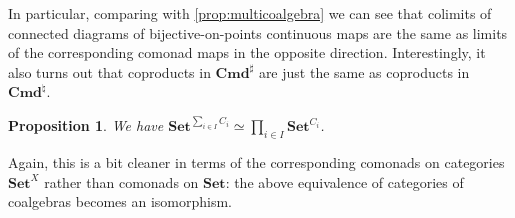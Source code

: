 \documentclass[11pt, oneside, article]{memoir}
\theoremstyle{plain}
\newtheorem{proposition}[theorem]{Proposition}
\theoremstyle{definition}
\theoremstyle{remark}
\DeclarePairedDelimiter{\abs}{\lvert}{\rvert}
\newcommand{\xto}[1]{\xrightarrow{#1}}
\newcommand{\namedcat}[1]{\mathbf{#1}}
\newcommand{\cat}[1]{\mathbf{#1}}
\newcommand{\Set}{\namedcat{Set}}
\newcommand{\Com}{\namedcat{Cmd}^\sharp}
\newcommand{\ComSet}{\Com}
\newcommand{\Con}{\namedcat{Cmd}^\natural}
\newcommand{\ConSet}{\Con}
\newcommand{\CoalgOn}[2]{{#2}^{#1}}
\newcommand{\CoalgSet}[1]{\CoalgOn{#1}{\Set}}
\newcommand{\pts}[1]{{\abs{#1}}}
\newcommand{\obs}[1]{\pts{#1}}
\newcommand{\carr}{\Sigma}
\newcommand{\reindex}[1]{\Delta_{#1}}
\newcommand{\car}[1]{\carr^{#1}}
\newcommand{\carC}{\car{\cC}}
\newcommand{\fun}[2]{{#2}^{#1}}
\newcommand{\AccCon}{\Con_{\mathrm{small}}}
\newcommand{\AccConSet}{\AccCon}
\newcommand{\cmnd}[1]{{#1}}
\newcommand{\xX}{X}
\newcommand{\cC}{\cmnd{C}}
\newcommand{\cD}{\cmnd{D}}
\newcommand{\bC}{\cat{C}}
\newcommand{\CSet}{\CoalgSet{\cC}}
\newcommand{\DSet}{\CoalgSet{\cD}}
\newcommand{\SetpD}{\Set^\pts{\cD}}
\newcommand{\anoteNI}[1]{}
\begin{document}


In particular, comparing with \cref{prop:multicoalgebra} we can see
that colimits of connected diagrams of bijective-on-points continuous
maps are the same as limits of the corresponding comonad maps in the
opposite direction.
Interestingly, it also turns out that coproducts in
$\ComSet$ are just the same as coproducts in $\ConSet$. \anoteNI{Are
  they double-categorical coproducts?}


\begin{proposition}\label{prop:coproduct}
  We have
  $\CoalgSet{\sum_{i \in I}\cC_i} \simeq \prod_{i \in I}
  \CoalgSet{\cC_i}$.
\end{proposition}

Again, this is a bit cleaner in terms of the corresponding comonads on
categories $\Set^\xX$ rather than comonads on $\Set$: the above
equivalence of categories of coalgebras becomes an isomorphism.
\end{document}
